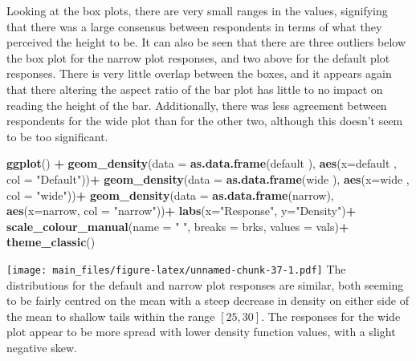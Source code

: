 \documentclass[
]{article}
\newenvironment{Shaded}{\begin{snugshade}}{\end{snugshade}}
\newcommand{\DataTypeTok}[1]{\textcolor[rgb]{0.13,0.29,0.53}{#1}}
\newcommand{\KeywordTok}[1]{\textcolor[rgb]{0.13,0.29,0.53}{\textbf{#1}}}
\newcommand{\NormalTok}[1]{#1}
\newcommand{\OperatorTok}[1]{\textcolor[rgb]{0.81,0.36,0.00}{\textbf{#1}}}
\newcommand{\StringTok}[1]{\textcolor[rgb]{0.31,0.60,0.02}{#1}}
\begin{document}
Looking at the box plots, there are very small ranges in the values,
signifying that there was a large consensus between respondents in terms
of what they perceived the height to be. It can also be seen that there
are three outliers below the box plot for the narrow plot responses, and
two above for the default plot responses. There is very little overlap
between the boxes, and it appears again that there altering the aspect
ratio of the bar plot has little to no impact on reading the height of
the bar. Additionally, there was less agreement between respondents for
the wide plot than for the other two, although this doesn't seem to be
too significant.

\begin{Shaded}
\begin{Highlighting}[]
\KeywordTok{ggplot}\NormalTok{() }\OperatorTok{+}
\StringTok{  }\KeywordTok{geom_density}\NormalTok{(}\DataTypeTok{data =} \KeywordTok{as.data.frame}\NormalTok{(default ), }\KeywordTok{aes}\NormalTok{(}\DataTypeTok{x=}\NormalTok{default , }\DataTypeTok{col =} \StringTok{"Default"}\NormalTok{))}\OperatorTok{+}
\StringTok{  }\KeywordTok{geom_density}\NormalTok{(}\DataTypeTok{data =} \KeywordTok{as.data.frame}\NormalTok{(wide   ), }\KeywordTok{aes}\NormalTok{(}\DataTypeTok{x=}\NormalTok{wide   , }\DataTypeTok{col =} \StringTok{"wide"}\NormalTok{))}\OperatorTok{+}
\StringTok{  }\KeywordTok{geom_density}\NormalTok{(}\DataTypeTok{data =} \KeywordTok{as.data.frame}\NormalTok{(narrow), }\KeywordTok{aes}\NormalTok{(}\DataTypeTok{x=}\NormalTok{narrow, }\DataTypeTok{col =} \StringTok{"narrow"}\NormalTok{))}\OperatorTok{+}
\StringTok{  }\KeywordTok{labs}\NormalTok{(}\DataTypeTok{x=}\StringTok{"Response"}\NormalTok{, }\DataTypeTok{y=}\StringTok{"Density"}\NormalTok{)}\OperatorTok{+}
\StringTok{  }\KeywordTok{scale_colour_manual}\NormalTok{(}\DataTypeTok{name =} \StringTok{" "}\NormalTok{, }\DataTypeTok{breaks =}\NormalTok{ brks, }\DataTypeTok{values =}\NormalTok{ vals)}\OperatorTok{+}
\StringTok{  }\KeywordTok{theme_classic}\NormalTok{()}
\end{Highlighting}
\end{Shaded}

\texttt{[image: main\_files/figure-latex/unnamed-chunk-37-1.pdf]} The
distributions for the default and narrow plot responses are similar,
both seeming to be fairly centred on the mean with a steep decrease in
density on either side of the mean to shallow tails within the range
\([25, 30]\). The responses for the wide plot appear to be more spread
with lower density function values, with a slight negative skew.
\end{document}
